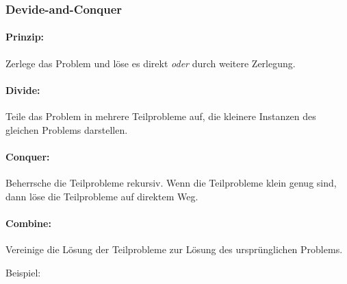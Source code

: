 		\subsubsection{Devide-and-Conquer}
			\paragraph{Prinzip:} Zerlege das Problem und löse es direkt \textit{oder} durch weitere Zerlegung.
			\paragraph{Divide:} Teile das Problem in mehrere Teilprobleme auf, die kleinere Instanzen des gleichen Problems darstellen.
			\paragraph{Conquer:} Beherrsche die Teilprobleme rekursiv. Wenn die Teilprobleme klein genug sind, dann löse die Teilprobleme auf direktem Weg.
			\paragraph{Combine:} Vereinige die Lösung der Teilprobleme zur Lösung des ursprünglichen Problems.
		
			\begin{center}
				Beispiel: \underline{}
			\end{center}
			\vspace{1.5cm}
		
		
